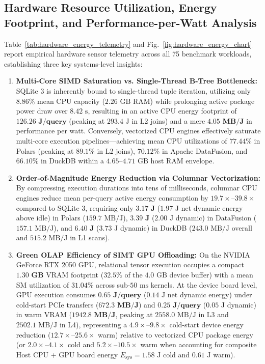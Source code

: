 \documentclass[10pt,a4paper]{article}
\begin{document}
\subsection{Hardware Resource Utilization, Energy Footprint, and Performance-per-Watt Analysis}
Table~\ref{tab:hardware_energy_telemetry} and Fig.~\ref{fig:hardware_energy_chart} report empirical hardware sensor telemetry across all 75 benchmark workloads, establishing three key systems-level insights:
\begin{enumerate}[leftmargin=1.5em,itemsep=2pt]
    \item \textbf{Multi-Core SIMD Saturation vs. Single-Thread B-Tree Bottleneck:} SQLite 3 is inherently bound to single-thread tuple iteration, utilizing only $8.86\%$ mean CPU capacity ($2.26\text{ GB}$ RAM) while prolonging active package power draw over $8.42\text{ s}$, resulting in an active CPU energy footprint of $\mathbf{126.26\text{ J/query}}$ (peaking at $293.4\text{ J}$ in L2 joins) and a mere $\mathbf{4.05\text{ MB/J}}$ in performance per watt. Conversely, vectorized CPU engines effectively saturate multi-core execution pipelines---achieving mean CPU utilizations of $\mathbf{77.44\%}$ in Polars (peaking at $89.1\%$ in L2 joins), $\mathbf{70.12\%}$ in Apache DataFusion, and $\mathbf{66.10\%}$ in DuckDB within a $4.65\text{--}4.71\text{ GB}$ host RAM envelope.
    \item \textbf{Order-of-Magnitude Energy Reduction via Columnar Vectorization:} By compressing execution durations into tens of milliseconds, columnar CPU engines reduce mean per-query active energy consumption by $19.7\times\text{--}39.8\times$ compared to SQLite 3, requiring only $\mathbf{3.17\text{ J}}$ ($1.97\text{ J}$ net dynamic energy above idle) in Polars ($159.7\text{ MB/J}$), $\mathbf{3.39\text{ J}}$ ($2.00\text{ J}$ dynamic) in DataFusion ($157.1\text{ MB/J}$), and $\mathbf{6.40\text{ J}}$ ($3.73\text{ J}$ dynamic) in DuckDB ($243.0\text{ MB/J}$ overall and $515.2\text{ MB/J}$ in L1 scans).
    \item \textbf{Green OLAP Efficiency of SIMT GPU Offloading:} On the NVIDIA GeForce RTX 2050 GPU, relational tensor execution occupies a compact $\mathbf{1.30\text{ GB}}$ VRAM footprint ($32.5\%$ of the $4.0\text{ GB}$ device buffer) with a mean SM utilization of $\mathbf{31.04\%}$ across sub-$50\text{ ms}$ kernels. At the device board level, GPU execution consumes $\mathbf{0.65\text{ J/query}}$ ($0.14\text{ J}$ net dynamic energy) under cold-start PCIe transfers ($\mathbf{672.3\text{ MB/J}}$) and $\mathbf{0.25\text{ J/query}}$ ($0.05\text{ J}$ dynamic) in warm VRAM ($\mathbf{1942.8\text{ MB/J}}$, peaking at $2558.0\text{ MB/J}$ in L3 and $2502.1\text{ MB/J}$ in L4), representing a $\mathbf{4.9\times\text{--}9.8\times}$ cold-start device energy reduction ($12.7\times\text{--}25.6\times$ warm) relative to vectorized CPU package energy (or $2.0\times\text{--}4.1\times$ cold and $5.2\times\text{--}10.5\times$ warm when accounting for composite Host CPU + GPU board energy $E_{\text{sys}} = 1.58\text{ J}$ cold and $0.61\text{ J}$ warm).
\end{enumerate}
\end{document}
